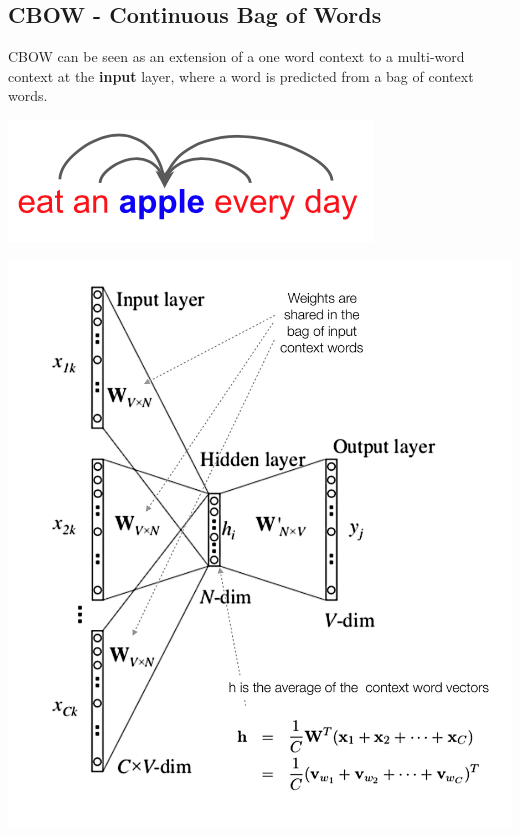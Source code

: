 \documentclass[11pt]{article}
\begin{document}
\subsection{CBOW - Continuous Bag of Words}
\begin{minipage}{0.5\linewidth}
	CBOW can be seen as an extension of a one word context to a multi-word context at the \textbf{input} layer, where a word is predicted from a bag of context words.
	
	\begin{center}
		\includegraphics[width=0.6\linewidth]{img/cbow_context}
	\end{center}
\end{minipage}
\begin{minipage}{0.5\linewidth}
	\centering
	\includegraphics[width=\linewidth]{img/cbow}
\end{minipage}
\end{document}
